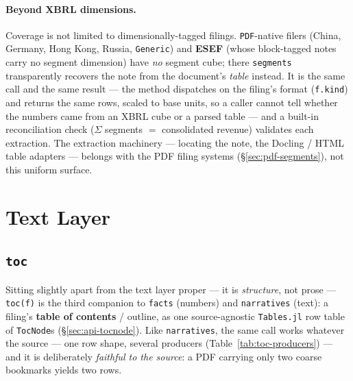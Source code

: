 \documentclass[11pt,a4paper]{report}
\begin{document}
\paragraph{Beyond XBRL dimensions.} Coverage is not limited to dimensionally-tagged filings.
\texttt{PDF}-native filers (China, Germany, Hong Kong, Russia, \texttt{Generic}) and \textbf{ESEF} (whose
block-tagged notes carry no segment dimension) have \emph{no} segment cube; there \texttt{segments}
transparently recovers the note from the document's \emph{table} instead. It is the same call and the same
result --- the method dispatches on the filing's format (\texttt{f.kind}) and returns the same rows, scaled to
base units, so a caller cannot tell whether the numbers came from an XBRL cube or a parsed table --- and a
built-in reconciliation check ($\Sigma$ segments $=$ consolidated revenue) validates each extraction. The
extraction machinery --- locating the note, the Docling / HTML table adapters --- belongs with the PDF filing
systems (\S\ref{sec:pdf-segments}), not this uniform surface.


\section{Text Layer}
\label{sec:api-narratives}

\subsection{\texttt{toc}}
\label{sec:api-toc}

Sitting slightly apart from the text layer proper --- it is \emph{structure}, not prose --- \texttt{toc(f)} is
the third companion to \texttt{facts} (numbers) and \texttt{narratives} (text): a filing's \textbf{table of
contents} / outline, as one source-agnostic \texttt{Tables.jl} row table of \texttt{TocNode}s
(\S\ref{sec:api-tocnode}). Like \texttt{narratives}, the same call works whatever the source --- one row shape,
several producers (Table~\ref{tab:toc-producers}) --- and it is deliberately \emph{faithful to the source}: a
PDF carrying only two coarse bookmarks yields two rows.
\end{document}
